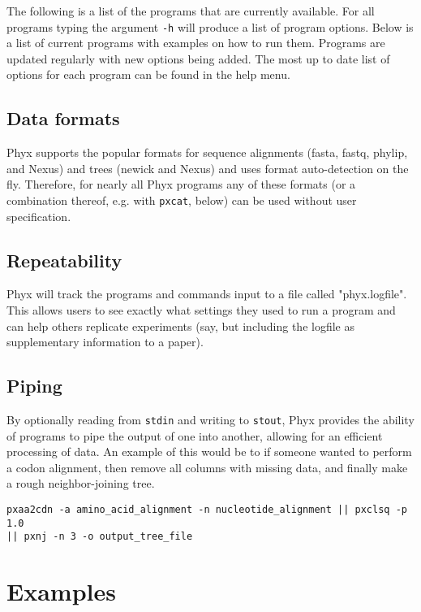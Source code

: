 \documentclass[12pt,letterpaper]{memoir}
\begin{document}
The following is a list of the programs that are currently available. For all programs typing the argument \texttt{-h} will produce a list of program options. Below is a list of current programs with examples on how to run them. Programs are updated regularly with new options being added. The most up to date list of options for each program can be found in the help menu.

\subsection{Data formats}

Phyx supports the popular formats for sequence alignments (fasta, fastq, phylip, and Nexus) and trees (newick and Nexus) and uses format auto-detection on the fly. Therefore, for nearly all Phyx programs any of these formats (or a combination thereof, e.g. with \texttt{pxcat}, below) can be used without user specification.


\subsection{Repeatability}

Phyx will track the programs and commands input to a file called "phyx.logfile". This allows users to see exactly what settings they used to run a program and can help others replicate experiments (say, but including the logfile as supplementary information to a paper).

\subsection{Piping}

By optionally reading from \texttt{stdin} and writing to \texttt{stout}, Phyx provides the ability of programs to pipe the output of one into another, allowing for an efficient processing of data. An example of this would be to if someone wanted to perform a codon alignment, then remove all columns with missing data, and finally make a rough neighbor-joining tree.
\begin{flushleft}
\begin{verbatim}
pxaa2cdn -a amino_acid_alignment -n nucleotide_alignment || pxclsq -p 1.0 
|| pxnj -n 3 -o output_tree_file
\end{verbatim}
\end{flushleft}

\section{Examples}
\end{document}

